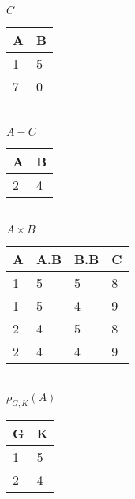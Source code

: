 \documentclass[12pt, a4paper]{article}
\begin{document}
			\begin{minipage}[t]{0.32\textwidth}
				\begin{center}
				$C$\\
				\begin{tabular}{|l|l|}
				\hline
				A & B \\ \hline
				1 & 5 \\ \hline
				7 & 0 \\ \hline
				\end{tabular}\\[4mm]
				$A- C$\\
				\begin{tabular}{|l|l|}
				\hline
				A & B \\ \hline
				2 & 4 \\ \hline
				\end{tabular}\\[4mm]
				$A\times B$\\
				\begin{tabular}{|l|l|l|l|}
				\hline
				A & A.B & B.B & C \\ \hline
				1 & 5 & 5 & 8\\ \hline
				1 & 5 & 4 & 9\\ \hline
				2 & 4 & 5 & 8\\ \hline
				2 & 4 & 4 & 9\\ \hline
				\end{tabular}\\[4mm]
				$\rho_{G,K}(A)$\\
				\begin{tabular}{|l|l|}
				\hline
				G & K \\ \hline
				1 & 5 \\ \hline
				2 & 4 \\ \hline
				\end{tabular}
				\end{center}				
			\end{minipage}
\end{document}
